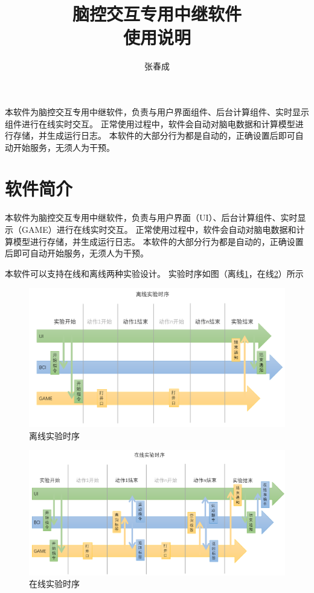 \documentclass[UTF8]{article}
\title{脑控交互专用中继软件 \\ 使用说明}
\author{张春成}
\begin{document}
\maketitle

本软件为脑控交互专用中继软件，负责与用户界面组件、后台计算组件、实时显示组件进行在线实时交互。
正常使用过程中，软件会自动对脑电数据和计算模型进行存储，并生成运行日志。
本软件的大部分行为都是自动的，正确设置后即可自动开始服务，无须人为干预。

\tableofcontents
\newpage

\section{软件简介}
本软件为脑控交互专用中继软件，负责与用户界面（UI）、后台计算组件、实时显示（GAME）进行在线实时交互。
正常使用过程中，软件会自动对脑电数据和计算模型进行存储，并生成运行日志。
本软件的大部分行为都是自动的，正确设置后即可自动开始服务，无须人为干预。

本软件可以支持在线和离线两种实验设计。
实验时序如图（离线\ref{fig:offline}，在线\ref{fig:online}）所示

\begin{figure}[htbp]
    \centering
    \includegraphics[width=12cm]{TimelineOffline.png}
    \caption{离线实验时序}
    \label{fig:offline}
\end{figure}

\begin{figure}[htbp]
    \centering
    \includegraphics[width=12cm]{TimelineOnline.png}
    \caption{在线实验时序}
    \label{fig:online}
\end{figure}
\end{document}
